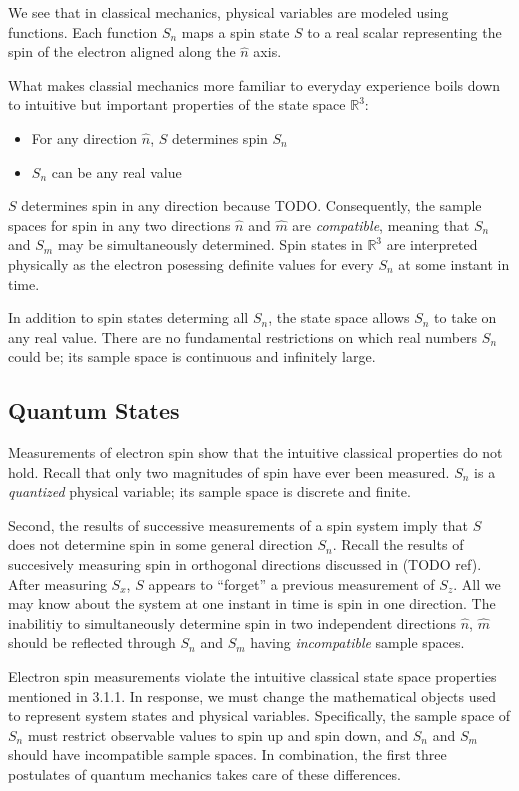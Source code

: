 We see that in classical mechanics, physical variables are modeled using functions. Each function $S_n$ maps a spin state $S$ to a real scalar representing the spin of the electron aligned along the $\hat{n}$ axis.

What makes classial mechanics more familiar to everyday experience boils down to intuitive but important properties of the state space $\mathbb{R}^3$:
\begin{itemize}
\item For any direction $\hat{n}$, $S$ determines spin $S_n$
\item $S_n$ can be any real value
\end{itemize}

$S$ determines spin in any direction because TODO. Consequently, the sample spaces for spin in any two directions $\hat{n}$ and $\hat{m}$ are \textit{compatible}, meaning that $S_n$ and $S_m$ may be simultaneously determined. Spin states in $\mathbb{R}^3$ are interpreted physically as the electron posessing definite values for every $S_n$ at some instant in time.

In addition to spin states determing all $S_n$, the state space allows $S_n$ to take on any real value. There are no fundamental restrictions on which real numbers $S_n$ could be; its sample space is continuous and infinitely large.

\subsection{Quantum States}
Measurements of electron spin show that the intuitive classical properties do not hold. Recall that only two magnitudes of spin have ever been measured. $S_n$ is a \textit{quantized} physical variable; its sample space is discrete and finite.

Second, the results of successive measurements of a spin system imply that $S$ does not determine spin in some general direction $S_n$. Recall the results of succesively measuring spin in orthogonal directions discussed in (TODO ref). After measuring $S_x$, $S$ appears to ``forget'' a previous measurement of $S_z$. All we may know about the system at one instant in time is spin in one direction. The inabilitiy to simultaneously determine spin in two independent directions $\hat{n}$, $\hat{m}$ should be reflected through $S_n$ and $S_m$ having \textit{incompatible} sample spaces.

Electron spin measurements violate the intuitive classical state space properties mentioned in 3.1.1. In response, we must change the mathematical objects used to represent system states and physical variables. Specifically, the sample space of $S_n$ must restrict observable values to spin up and spin down, and $S_n$ and $S_m$ should have incompatible sample spaces. In combination, the first three postulates of quantum mechanics takes care of these differences.

